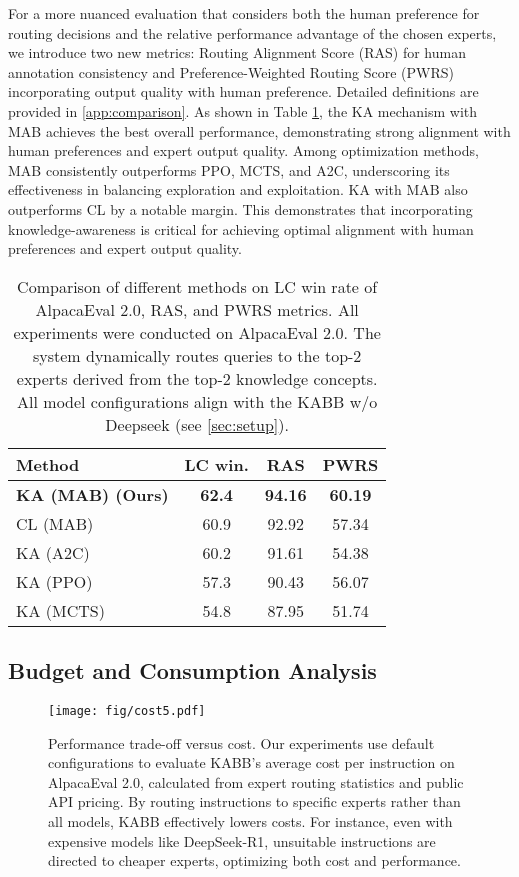 For a more nuanced evaluation that considers both the human preference for routing decisions and the relative performance advantage of the chosen experts, we introduce two new metrics: Routing Alignment Score (RAS) for human annotation consistency and Preference-Weighted Routing Score (PWRS) incorporating output quality with human preference. Detailed definitions are provided in \cref{app:comparison}.
As shown in Table \ref{tab:method_comparison}, the KA mechanism with MAB achieves the best overall performance, demonstrating strong alignment with human preferences and expert output quality. Among optimization methods, MAB consistently outperforms PPO, MCTS, and A2C, underscoring its effectiveness in balancing exploration and exploitation. KA with MAB also outperforms CL by a notable margin. This demonstrates that incorporating knowledge-awareness is critical for achieving optimal alignment with human preferences and expert output quality.
\begin{table}[t]
    \centering
    \begin{tabular}{lccc}
        \toprule
        Method & LC win. & RAS & PWRS \\
        \midrule
        \textbf{KA (MAB) (Ours)} & \textbf{62.4} & \textbf{94.16} & \textbf{60.19} \\
        CL (MAB) & 60.9 & 92.92 & 57.34 \\
        KA (A2C) & 60.2 & 91.61 & 54.38 \\
        KA (PPO) & 57.3 & 90.43 & 56.07 \\
        KA (MCTS) & 54.8 & 87.95 & 51.74 \\
        \bottomrule
    \end{tabular}
    \caption{Comparison of different methods on LC win rate of AlpacaEval 2.0, RAS, and PWRS metrics. All experiments were conducted on AlpacaEval 2.0. The system dynamically routes queries to the top-2 experts derived from the top-2 knowledge concepts. All model configurations align with the KABB w/o Deepseek (see \cref{sec:setup}).}
    \label{tab:method_comparison}
\end{table}
\subsection{Budget and Consumption Analysis}
\begin{figure}[h]
\begin{center}
\centerline{\texttt{[image: fig/cost5.pdf]}}
\caption{Performance trade-off versus cost. Our experiments use default configurations to evaluate KABB’s average cost per instruction on AlpacaEval 2.0, calculated from expert routing statistics and public API pricing\protect\footnotemark. By routing instructions to specific experts rather than all models, KABB effectively lowers costs. For instance, even with expensive models like DeepSeek-R1, unsuitable instructions are directed to cheaper experts, optimizing both cost and performance.}
\label{cost}
\end{center}
\end{figure}

